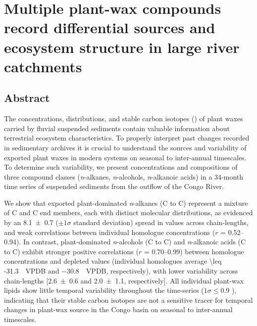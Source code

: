 \chapter{Multiple plant-wax compounds record differential sources and ecosystem structure in large river catchments}
\label{Ch4}
\raggedbottom

{\let\thefootnote\relax{}}

\clearpage

\section{Abstract}

The concentrations, distributions, and stable carbon isotopes () of plant waxes carried by fluvial suspended sediments contain valuable information about terrestrial ecosystem characteristics. To properly interpret past changes recorded in sedimentary archives it is crucial to understand the sources and variability of exported plant waxes in modern systems on seasonal to inter-annual timescales. To determine such variability, we present concentrations and  compositions of three compound classes (\textit{n}-alkanes, \textit{n}-alcohols, \textit{n}-alkanoic acids) in a 34-month time series of suspended sediments from the outflow of the Congo River.

We show that exported plant-dominated \textit{n}-alkanes (C to C) represent a mixture of C and C end members, each with distinct molecular distributions, as evidenced by an \SI{8.1 \pm  0.7}{\permil} ($\pm1\sigma$ standard deviation) spread in  values across chain-lengths, and weak correlations between individual homologue concentrations ($r$ = \numrange{0.52}{0.94}). In contrast, plant-dominated \textit{n}-alcohols (C to C) and \textit{n}-alkanoic acids (C to C) exhibit stronger positive correlations ($r$ = \numrange{0.70}{0.99}) between homologue concentrations and depleted  values (individual homologues average \SI{\leq -31.3}{\permil.VPDB} and \SI{-30.8}{\permil.VPDB}, respectively), with lower  variability across chain-lengths [\SI{2.6 \pm 0.6}{\permil} and \SI{2.0 \pm 1.1}{\permil}, respectively]. All individual plant-wax lipids show little temporal  variability throughout the time-series ($1\sigma \leq 0.9$ \si{\permil}), indicating that their stable carbon isotopes are not a sensitive tracer for temporal changes in plant-wax source in the Congo basin on seasonal to inter-annual timescales.

